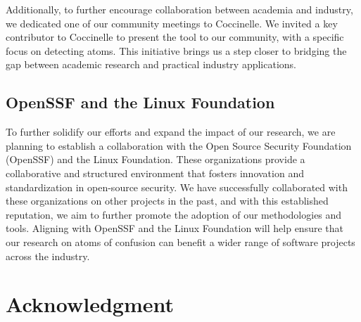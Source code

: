 \documentclass[conference]{IEEEtran}
\begin{document}
Additionally, to further encourage collaboration between academia and industry, we dedicated one of our community meetings to Coccinelle. We invited a key contributor to Coccinelle to present the tool to our community, with a specific focus on detecting atoms. This initiative brings us a step closer to bridging the gap between academic research and practical industry applications.

\subsection{OpenSSF and the Linux Foundation}

To further solidify our efforts and expand the impact of our research, we are planning to establish a collaboration with the Open Source Security Foundation (OpenSSF) and the Linux Foundation. These organizations provide a collaborative and structured environment that fosters innovation and standardization in open-source security. We have successfully collaborated with these organizations on other projects in the past, and with this established reputation, we aim to further promote the adoption of our methodologies and tools. Aligning with OpenSSF and the Linux Foundation will help ensure that our research on atoms of confusion can benefit a wider range of software projects across the industry.

\section*{Acknowledgment}
\end{document}
